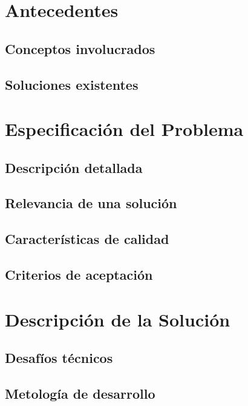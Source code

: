 \documentclass[upright, contnum]{umemoria}
\begin{document}
\chapter{Antecedentes}
\label{sec-2}

\section{Conceptos involucrados}
\label{sec-2.1}

\section{Soluciones existentes}
\label{sec-2.2}


\chapter{Especificación del Problema}
\label{sec-3}

\section{Descripción detallada}
\label{sec-3.1}

\section{Relevancia de una solución}
\label{sec-3.2}

\section{Características de calidad}
\label{sec-3.3}

\section{Criterios de aceptación}
\label{sec-3.4}


\chapter{Descripción de la Solución}
\label{sec-4}

\section{Desafíos técnicos}
\label{sec-4.1}

\section{Metología de desarrollo}
\label{sec-4.2}
\end{document}
